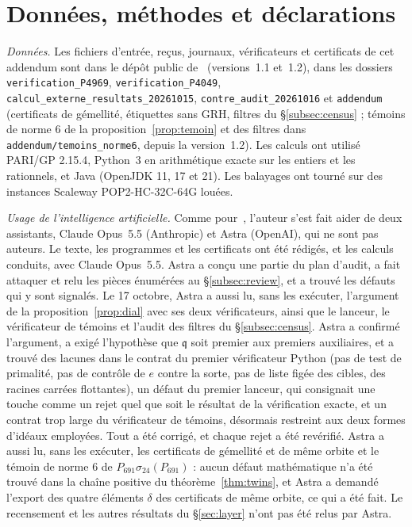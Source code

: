 \documentclass[11pt,a4paper]{amsart}
\theoremstyle{plain}
\theoremstyle{definition}
\newcommand{\q}{\mathfrak{q}}
\begin{document}
\section*{Données, méthodes et déclarations}
\emph{Données.} Les fichiers d'entrée, reçus, journaux, vérificateurs et certificats de cet addendum sont dans le dépôt public de~\cite{Gau26} (versions~1.1 et~1.2), dans les dossiers \texttt{verification\_P4969}, \texttt{verification\_P4049}, \texttt{calcul\_externe\_resultats\_20261015}, \texttt{contre\_audit\_20261016} et \texttt{addendum} (certificats de gémellité, étiquettes sans GRH, filtres du \S\ref{subsec:census} ; témoins de norme $6$ de la proposition~\ref{prop:temoin} et des filtres dans \texttt{addendum/temoins\_norme6}, depuis la version~1.2). Les calculs ont utilisé PARI/GP 2.15.4, Python~3 en arithmétique exacte sur les entiers et les rationnels, et Java (OpenJDK 11, 17 et 21). Les balayages ont tourné sur des instances Scaleway POP2-HC-32C-64G louées.

\emph{Usage de l'intelligence artificielle.} Comme pour~\cite{Gau26}, l'auteur s'est fait aider de deux assistants, Claude Opus~5.5 (Anthropic) et Astra (OpenAI), qui ne sont pas auteurs. Le texte, les programmes et les certificats ont été rédigés, et les calculs conduits, avec Claude Opus~5.5. Astra a conçu une partie du plan d'audit, a fait attaquer et relu les pièces énumérées au \S\ref{subsec:review}, et a trouvé les défauts qui y sont signalés. Le 17 octobre, Astra a aussi lu, sans les exécuter, l'argument de la proposition~\ref{prop:dial} avec ses deux vérificateurs, ainsi que le lanceur, le vérificateur de témoins et l'audit des filtres du \S\ref{subsec:census}. Astra a confirmé l'argument, a exigé l'hypothèse que $\q$ soit premier aux premiers auxiliaires, et a trouvé des lacunes dans le contrat du premier vérificateur Python (pas de test de primalité, pas de contrôle de $e$ contre la sorte, pas de liste figée des cibles, des racines carrées flottantes), un défaut du premier lanceur, qui consignait une touche comme un rejet quel que soit le résultat de la vérification exacte, et un contrat trop large du vérificateur de témoins, désormais restreint aux deux formes d'idéaux employées. Tout a été corrigé, et chaque rejet a été revérifié. Astra a aussi lu, sans les exécuter, les certificats de gémellité et de même orbite et le témoin de norme $6$ de $P_{691}\sigma_{24}(P_{691})$ : aucun défaut mathématique n'a été trouvé dans la chaîne positive du théorème~\ref{thm:twins}, et Astra a demandé l'export des quatre éléments $\delta$ des certificats de même orbite, ce qui a été fait. Le recensement et les autres résultats du \S\ref{sec:layer} n'ont pas été relus par Astra.
\end{document}
